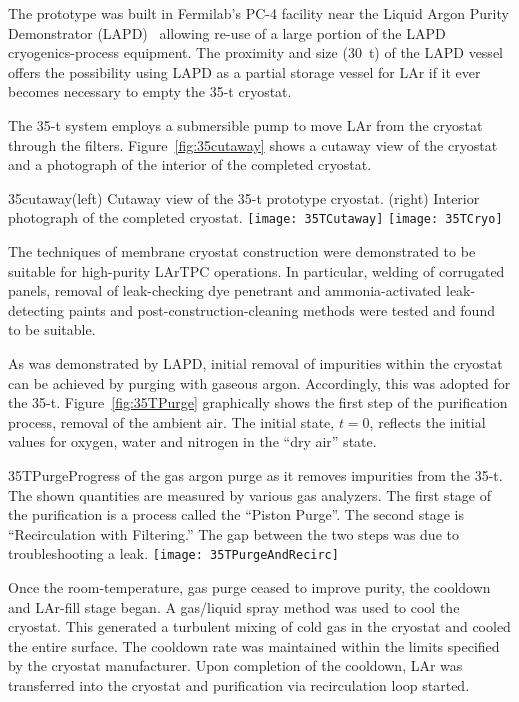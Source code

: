 The prototype was built in Fermilab's PC-4 facility near the Liquid
Argon Purity Demonstrator (LAPD)~\cite{bib:lapdP07005} 
allowing re-use of a large portion of the LAPD
cryogenics-process equipment.  The proximity and
size (30~t) of the LAPD vessel offers the possibility using
LAPD as a partial storage vessel for LAr if it ever becomes necessary
to empty the 35-t cryostat.

The 35-t system employs a submersible pump to move LAr from the
cryostat through the filters.  Figure~\ref{fig:35cutaway} shows a
cutaway view of the cryostat and a photograph of the interior of the
completed cryostat.
\begin{cdrfigure}{35cutaway}{(left) Cutaway view of the 35-t prototype cryostat. (right) Interior
photograph of the completed cryostat.}
\texttt{[image: 35TCutaway]}
\texttt{[image: 35TCryo]}
\end{cdrfigure}

The techniques of membrane cryostat construction were demonstrated to
be suitable for high-purity LArTPC operations.  In particular, welding of
corrugated panels, removal of leak-checking dye penetrant and
ammonia-activated leak-detecting paints and post-construction-cleaning
methods were tested and found to be suitable.


As was demonstrated by LAPD, initial removal of impurities within the
cryostat can be achieved by purging with gaseous argon. Accordingly,
this was adopted for the 35-t.  Figure~\ref{fig:35TPurge} graphically
shows the first step of the purification process, removal of the
ambient air.  The initial state, $t=0$, reflects the initial values
for oxygen, water and nitrogen in the ``dry air'' state.
\begin{cdrfigure}{35TPurge}{Progress of the gas argon purge as it removes impurities  from the 35-t. The shown quantities are measured by various gas analyzers. The first stage of the purification is a process called the ``Piston Purge''.  The second stage is ``Recirculation with Filtering.'' The gap between the two steps was due to troubleshooting a leak.}
\texttt{[image: 35TPurgeAndRecirc]}
\end{cdrfigure}

Once the room-temperature, gas purge ceased to improve purity,
the cooldown and LAr-fill stage began.  A gas/liquid spray method was
used to cool the cryostat.  This generated a turbulent mixing of cold
gas in the cryostat and cooled the entire surface.  The cooldown rate
was maintained within the limits specified by the cryostat
manufacturer.  Upon completion of the cooldown, LAr was transferred
into the cryostat and purification via recirculation loop started.

